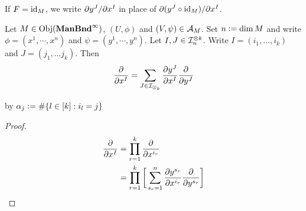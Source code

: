 \documentclass{book}
\begin{document}
\begin{note}
	If $F = \operatorname{id}_M$, we write $\partial y^J/\partial x^I$ in place of $\partial (y^J \circ \operatorname{id}_M) / \partial x^I$.
\end{note}

\begin{ex}
	Let $M \in \operatorname{Obj}(\operatorname*{\text{\textbf{ManBnd}}^{\infty}})$, $(U, \phi)$ and $(V, \psi) \in \mathcal{A}_M$. Set $n \vcentcolon= \dim M$ and write $\phi = (x^1, \cdots, x^n)$ and $\psi = (y^1, \cdots, y^n)$. Let $I, J \in \mathcal{I}_n^{\otimes k}$. Write $I = (i_1, \ldots, i_k)$ and $J = (j_1, \ldots j_k)$. Then 
	$$\frac{\partial }{ \partial x^I} = \sum_{J \in \mathcal{I}_{\otimes_k}} \frac{\partial y^J}{\partial x^I} \frac{\partial }{\partial y^J}$$
\end{ex}

 by $\alpha_j \vcentcolon= \# \{l \in [k]: i_l = j\}$

\begin{proof}
	\begin{align*}
		\frac{\partial}{\partial x^I}
		& = \prod_{r=1}^k \frac{\partial}{\partial x^{i_r}} \\
		& = \prod_{r=1}^k \bigg[ \sum_{s_r = 1}^n  \frac{\partial y^{s_r}}{\partial x^{i_r}} \frac{\partial}{\partial y^{s_r}} \bigg] \\
	\end{align*}
\end{proof}
\end{document}
